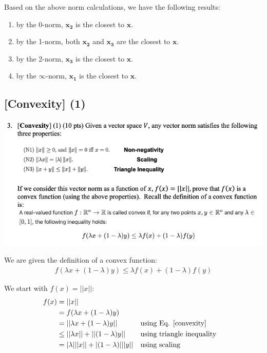 Based on the above norm calculations, we have the following results:
\begin{enumerate}
    \item by the 0-norm, $\mathbf{x_2}$ is the closest to $\mathbf{x}$.
    \item by the 1-norm, both $\mathbf{x_2}$ and $\mathbf{x_3}$ are the closest to $\mathbf{x}$.
    \item by the 2-norm, $\mathbf{x_3}$ is the closest to $\mathbf{x}$.
    \item by the $\infty$-norm, $\mathbf{x_1}$ is the closest to $\mathbf{x}$.
\end{enumerate}

\subsection{[Convexity] (1)}

\includegraphics[width=1\textwidth]{media/hw2_q3.png}

We are given the definition of a convex function:
\begin{align}
    f(\lambda x + (1-\lambda)y) \leq \lambda f(x) + (1-\lambda) f(y) \label{convexity}
\end{align}

We start with $f(x) = ||x||$:
\begin{align}
    f(x) &= ||x|| \nonumber \\
    &= f(\lambda x + (1-\lambda)y) \nonumber \\
    &= ||\lambda x + (1-\lambda)y|| && \text{using Eq. \ref{convexity}} \nonumber \\
    &\leq ||\lambda x || + ||(1-\lambda) y|| && \text{using triangle inequality} \nonumber \\
    &= |\lambda | ||x|| + |(1-\lambda)| ||y|| && \text{using scaling} \label{q3_2}
\end{align}

